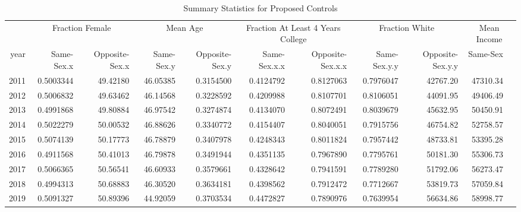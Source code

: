 \begin{table}

\caption{Summary Statistics for Proposed Controls}
\centering
\begin{tabular}[t]{r|r|r|r|r|r|r|r|r|r}
\hline
\multicolumn{1}{c|}{ } & \multicolumn{2}{c|}{Fraction Female} & \multicolumn{2}{c|}{Mean Age} & \multicolumn{2}{c|}{Fraction At Least 4 Years College} & \multicolumn{2}{c|}{Fraction White} & \multicolumn{2}{c}{Mean Income} \\
\cline{2-3} \cline{4-5} \cline{6-7} \cline{8-9} \cline{10-11}
year & Same-Sex.x & Opposite-Sex.x & Same-Sex.y & Opposite-Sex.y & Same-Sex.x.x & Opposite-Sex.x.x & Same-Sex.y.y & Opposite-Sex.y.y & Same-Sex\\
\hline
2011 & 0.5003344 & 49.42180 & 46.05385 & 0.3154500 & 0.4124792 & 0.8127063 & 0.7976047 & 42767.20 & 47310.34\\
\hline
2012 & 0.5006832 & 49.63462 & 46.14568 & 0.3228592 & 0.4209988 & 0.8107701 & 0.8106051 & 44091.95 & 49406.49\\
\hline
2013 & 0.4991868 & 49.80884 & 46.97542 & 0.3274874 & 0.4134070 & 0.8072491 & 0.8039679 & 45632.95 & 50450.91\\
\hline
2014 & 0.5022279 & 50.00532 & 46.88626 & 0.3340772 & 0.4154407 & 0.8040051 & 0.7915756 & 46754.82 & 52758.57\\
\hline
2015 & 0.5074139 & 50.17773 & 46.78879 & 0.3407978 & 0.4248343 & 0.8011824 & 0.7957442 & 48733.81 & 53395.28\\
\hline
2016 & 0.4911568 & 50.41013 & 46.79878 & 0.3491944 & 0.4351135 & 0.7967890 & 0.7795761 & 50181.30 & 55306.73\\
\hline
2017 & 0.5066365 & 50.56541 & 46.60933 & 0.3579661 & 0.4328642 & 0.7941591 & 0.7789280 & 51792.06 & 56273.47\\
\hline
2018 & 0.4994313 & 50.68883 & 46.30520 & 0.3634181 & 0.4398562 & 0.7912472 & 0.7712667 & 53819.73 & 57059.84\\
\hline
2019 & 0.5091327 & 50.89396 & 44.92059 & 0.3703534 & 0.4472827 & 0.7890976 & 0.7639954 & 56634.86 & 58998.77\\
\hline
\end{tabular}
\end{table}
